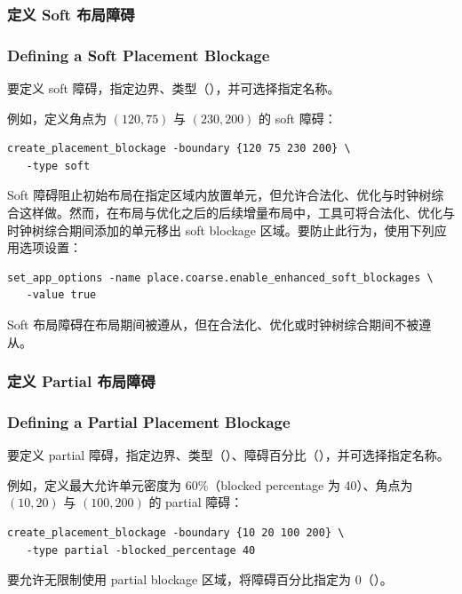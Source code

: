 \subsubsection{定义 Soft 布局障碍}
\subsubsection*{Defining a Soft Placement Blockage}

要定义 soft 障碍，指定边界、类型（），并可选择指定名称。

例如，定义角点为 $(120, 75)$ 与 $(230, 200)$ 的 soft 障碍：
\begin{lstlisting}
create_placement_blockage -boundary {120 75 230 200} \
   -type soft
\end{lstlisting}

Soft 障碍阻止初始布局在指定区域内放置单元，但允许合法化、优化与时钟树综合这样做。然而，在布局与优化之后的后续增量布局中，工具可将合法化、优化与时钟树综合期间添加的单元移出 soft blockage 区域。要防止此行为，使用下列应用选项设置：
\begin{lstlisting}
set_app_options -name place.coarse.enable_enhanced_soft_blockages \
   -value true
\end{lstlisting}

\begin{noteBox}
Soft 布局障碍在布局期间被遵从，但在合法化、优化或时钟树综合期间不被遵从。
\end{noteBox}

\subsubsection{定义 Partial 布局障碍}
\subsubsection*{Defining a Partial Placement Blockage}

要定义 partial 障碍，指定边界、类型（）、障碍百分比（），并可选择指定名称。

例如，定义最大允许单元密度为 60\%（blocked percentage 为 40）、角点为 $(10, 20)$ 与 $(100, 200)$ 的 partial 障碍：
\begin{lstlisting}
create_placement_blockage -boundary {10 20 100 200} \
   -type partial -blocked_percentage 40
\end{lstlisting}

要允许无限制使用 partial blockage 区域，将障碍百分比指定为 0（）。

